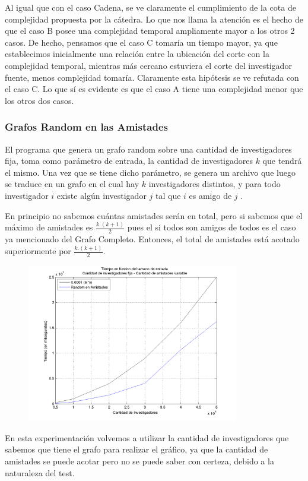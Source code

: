 Al igual que con el caso Cadena, se ve claramente el cumplimiento de la cota de complejidad propuesta por la cátedra. Lo que nos llama la atención es el hecho de que el caso B posee una complejidad temporal ampliamente mayor a los otros 2 casos. De hecho, pensamos que el caso C tomaría un tiempo mayor, ya que establecimos inicialmente una relación entre la ubicación del corte con la complejidad temporal, mientras más cercano estuviera el corte del investigador fuente, menos complejidad tomaría. Claramente esta hipótesis se ve refutada con el caso C. Lo que sí es evidente es que el caso A tiene una complejidad menor que los otros dos casos.

\subsubsection{Grafos Random en las Amistades}
El programa que genera un grafo random sobre una cantidad de investigadores fija, toma como parámetro de entrada, la cantidad de investigadores $k$ que tendrá el mismo. Una vez que se tiene dicho parámetro, se genera un archivo que luego se traduce en un grafo en el cual hay $k$ investigadores distintos, y 
para todo investigador $i$ existe algún investigador $j$ tal que $i$ es amigo de $j$ . 

En principio no sabemos cuántas amistades serán en total, pero si sabemos que el máximo de amistades es $\frac{k.(k+1)}{2}$ pues el si todos son amigos de todos es el caso ya mencionado del Grafo Completo. Entonces, el total de amistades está acotado superiormente por  $\frac{k.(k+1)}{2}$.

\begin{figure}[h]
	\centering
	\includegraphics[width=350px]{./figs/cotaInvestigadores.png}
\end{figure}

En esta experimentación volvemos a utilizar la cantidad de investigadores que sabemos que tiene el grafo para realizar el gráfico, ya que la cantidad de amistades se puede acotar pero no se puede saber con certeza, debido a la naturaleza del test.

